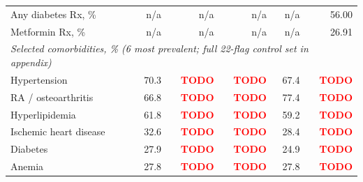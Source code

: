 \begin{tabular}{l rrrr r}
Any diabetes Rx, \%            & n/a & n/a & n/a & n/a & 56.00 \\
\quad Metformin Rx, \%         & n/a & n/a & n/a & n/a & 26.91 \\[4pt]
\multicolumn{6}{l}{\textit{Selected comorbidities, \% (6 most prevalent; full 22-flag control set in appendix)}} \\
Hypertension                   & 70.3 & \textcolor{red}{\textbf{TODO}} & \textcolor{red}{\textbf{TODO}} & 67.4 & \textcolor{red}{\textbf{TODO}} \\
RA / osteoarthritis            & 66.8 & \textcolor{red}{\textbf{TODO}} & \textcolor{red}{\textbf{TODO}} & 77.4 & \textcolor{red}{\textbf{TODO}} \\
Hyperlipidemia                 & 61.8 & \textcolor{red}{\textbf{TODO}} & \textcolor{red}{\textbf{TODO}} & 59.2 & \textcolor{red}{\textbf{TODO}} \\
Ischemic heart disease         & 32.6 & \textcolor{red}{\textbf{TODO}} & \textcolor{red}{\textbf{TODO}} & 28.4 & \textcolor{red}{\textbf{TODO}} \\
Diabetes                       & 27.9 & \textcolor{red}{\textbf{TODO}} & \textcolor{red}{\textbf{TODO}} & 24.9 & \textcolor{red}{\textbf{TODO}} \\
Anemia                         & 27.8 & \textcolor{red}{\textbf{TODO}} & \textcolor{red}{\textbf{TODO}} & 27.8 & \textcolor{red}{\textbf{TODO}} \\
\bottomrule
\end{tabular}
